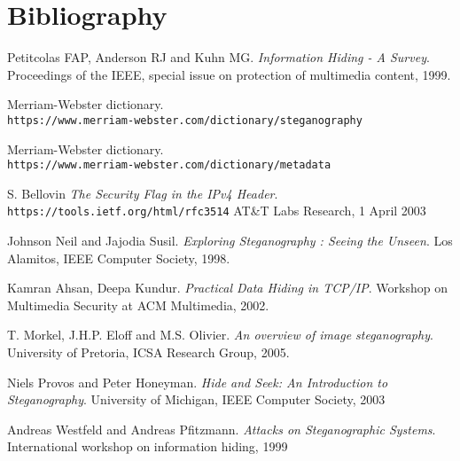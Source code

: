 \documentclass[notitlepage]{report}
\begin{document}
\chapter{Bibliography}
\begin{thebibliography}{9}
Petitcolas FAP, Anderson RJ and Kuhn MG.
\textit{Information Hiding - A Survey}.
Proceedings of the IEEE, special issue on protection of multimedia content, 1999.


Merriam-Webster dictionary.
\\\texttt{https://www.merriam-webster.com/dictionary/steganography}

Merriam-Webster dictionary.
\\\texttt{https://www.merriam-webster.com/dictionary/metadata}

S. Bellovin
\textit{The Security Flag in the IPv4 Header}. 
\\\texttt{https://tools.ietf.org/html/rfc3514}
AT\&T Labs Research, 1 April 2003

Johnson Neil and Jajodia Susil.
\textit{Exploring Steganography : Seeing the Unseen}. 
Los Alamitos, IEEE Computer Society, 1998.

Kamran Ahsan, Deepa Kundur.
\textit{Practical Data Hiding in TCP/IP}. 
Workshop on Multimedia Security at ACM Multimedia, 2002.

%
T. Morkel, J.H.P. Eloff and M.S. Olivier. 
\textit{An overview of image steganography}.
University of Pretoria, ICSA Research Group, 2005.

Niels Provos and Peter Honeyman.
\textit{Hide and Seek: An Introduction to Steganography}.
University of Michigan, IEEE Computer Society, 2003

Andreas Westfeld and Andreas Pfitzmann.
\textit{Attacks on Steganographic Systems}.
International workshop on information hiding, 1999
\end{thebibliography}
\end{document}
